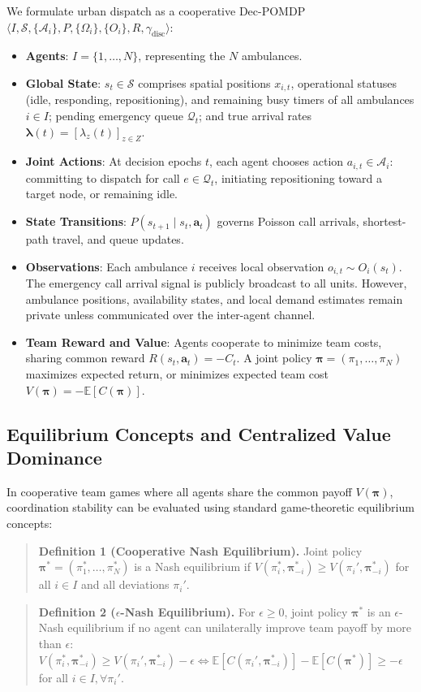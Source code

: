 \documentclass{article}
\begin{document}
We formulate urban dispatch as a cooperative Dec-POMDP $\langle I, \mathcal{S}, \{\mathcal{A}_i\}, P, \{\Omega_i\}, \{O_i\}, R, \gamma_{\mathrm{disc}} \rangle$:
\begin{itemize}\itemsep1pt
\item \textbf{Agents}: $I = \{1, \ldots, N\}$, representing the $N$ ambulances.
\item \textbf{Global State}: $s_t \in \mathcal{S}$ comprises spatial positions $x_{i,t}$, operational statuses (idle, responding, repositioning), and remaining busy timers of all ambulances $i \in I$; pending emergency queue $\mathcal{Q}_t$; and true arrival rates $\boldsymbol{\lambda}(t) = [\lambda_z(t)]_{z\in Z}$.
\item \textbf{Joint Actions}: At decision epochs $t$, each agent chooses action $a_{i,t} \in \mathcal{A}_i$: committing to dispatch for call $e \in \mathcal{Q}_t$, initiating repositioning toward a target node, or remaining idle.
\item \textbf{State Transitions}: $P(s_{t+1} \mid s_t, \mathbf{a}_t)$ governs Poisson call arrivals, shortest-path travel, and queue updates.
\item \textbf{Observations}: Each ambulance $i$ receives local observation $o_{i,t} \sim O_i(s_t)$. The emergency call arrival signal is publicly broadcast to all units. However, ambulance positions, availability states, and local demand estimates remain private unless communicated over the inter-agent channel.
\item \textbf{Team Reward and Value}: Agents cooperate to minimize team costs, sharing common reward $R(s_t, \mathbf{a}_t) = -C_t$. A joint policy $\boldsymbol{\pi} = (\pi_1, \ldots, \pi_N)$ maximizes expected return, or minimizes expected team cost $V(\boldsymbol{\pi}) = -\mathbb{E}[C(\boldsymbol{\pi})]$.
\end{itemize}

\subsection{Equilibrium Concepts and Centralized Value Dominance}
In cooperative team games where all agents share the common payoff $V(\boldsymbol{\pi})$, coordination stability can be evaluated using standard game-theoretic equilibrium concepts:
\begin{quote}\small
\textbf{Definition 1 (Cooperative Nash Equilibrium).} Joint policy $\boldsymbol{\pi}^* = (\pi_1^*, \ldots, \pi_N^*)$ is a Nash equilibrium if $V(\pi_i^*, \boldsymbol{\pi}_{-i}^*) \ge V(\pi_i', \boldsymbol{\pi}_{-i}^*)$ for all $i \in I$ and all deviations $\pi_i'$.
\end{quote}
\begin{quote}\small
\textbf{Definition 2 ($\epsilon$-Nash Equilibrium).} For $\epsilon \ge 0$, joint policy $\boldsymbol{\pi}^*$ is an $\epsilon$-Nash equilibrium if no agent can unilaterally improve team payoff by more than $\epsilon$: $V(\pi_i^*, \boldsymbol{\pi}_{-i}^*) \ge V(\pi_i', \boldsymbol{\pi}_{-i}^*) - \epsilon \iff \mathbb{E}[C(\pi_i', \boldsymbol{\pi}_{-i}^*)] - \mathbb{E}[C(\boldsymbol{\pi}^*)] \ge -\epsilon$ for all $i \in I, \forall \pi_i'$.
\end{quote}
\end{document}
